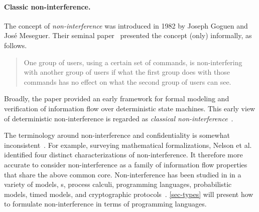 \paragraph*{Classic non-interference.}
The concept of \emph{non-interference} was introduced in 1982 by Joseph Goguen and José Meseguer.
Their seminal paper~\cite{goguen1982} presented the concept (only) informally, as follows.
\begin{quotation}
\noindent One group of users, using a certain set of commands, is non-interfering with another group of users if what the first group does with those commands has no effect on what the second group of users can see.
\end{quotation}
Broadly, the paper provided an early framework for formal modeling and verification of information flow
over deterministic state machines.
This early view of deterministic non-interference is regarded as \emph{classical non-interference}~\cite{focardi1997}.

The terminology around non-interference and confidentiality 
is somewhat inconsistent~\cite{sabelfeld2003,vandermeyden2007}.
For example, surveying mathematical formalizations, Nelson et al.~\cite{nelson2020} 
identified four distinct characterizations of non-interference.
It therefore more accurate to consider non-interference as a family of 
information flow properties that share the above common core.
Non-interference has been studied in in a variety of models, 
\eg {}s,
process calculi, programming languages, probabilistic models, timed models, and {cryptographic protocols}~\cite{bossi2005}.
\autoref{sec-types} will present how to formulate non-interference in terms of programming languages.

